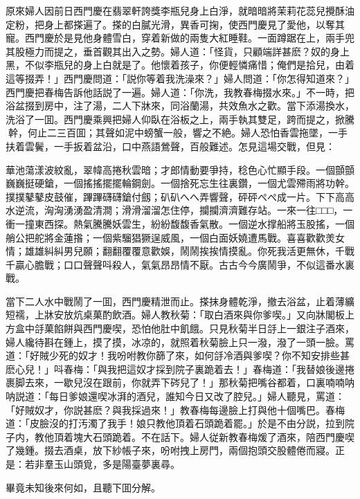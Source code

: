 原來婦人因前日西門慶在翡翠軒誇獎李瓶兒身上白淨，就暗暗將茉莉花蕊兒攪酥油定粉，把身上都搽遍了。搽的白膩光滑，異香可掬，使西門慶見了愛他，以奪其寵。西門慶於是見他身體雪白，穿着新做的兩隻大紅睡鞋。一面蹲踞在上，兩手兜其股極力而提之，垂首觀其出入之勢。婦人道：「怪貨，只顧端詳甚麽？奴的身上黑，不似李瓶兒的身上白就是了。他懷着孩子，你便輕憐痛惜；俺們是拾兒，由着這等掇弄！」西門慶問道：「説你等着我洗澡來？」婦人問道：「你怎得知道來？」西門慶把春梅告訴他話説了一遍。婦人道：「你洗，我教春梅掇水來。」不一時，把浴盆掇到房中，注了湯，二人下牀來，同浴蘭湯，共效魚水之歡。當下添湯換水，洗浴了一囬。西門慶乘興把婦人仰臥在浴板之上，兩手執其雙足，跨而提之，掀騰𢵞幹，何止二三百囬；其聲如泥中螃蟹一般，響之不絶。婦人恐怕香雲拖墜，一手扶着雲鬢，一手扳着盆沿，口中燕語鶯聲，百般難述。怎見這場交戰，但見：

\begin{myquote}
華池蕩漾波紋亂，翠幃高捲秋雲暗；才郎情動要爭持，稔色心忙顯手段。一個顫顫巍巍挺硬鎗，一個搖搖擺擺輪鋼劍。一個捨死忘生往裏鑽，一個尤雲殢雨將功幹。撲撲鼕鼕皮鼓催，蹕蹕礴礴鎗付劔；𥐙𥐙へへ弄響聲，砰砰ぺぺ成一片。下下高高水逆流，洶洶湧湧盈清澗；滑滑溜溜怎住停，攔攔濟濟難存站。一來一往□□□，一衝一撞東西探。熱氣騰騰妖雲生，紛紛馥馥香氣散。一個逆水撑船將玉股搖，一個艄公把舵將金蓮揝；一個紫騮猖獗逞威風，一個白面妖嬈遭馬戰。喜喜歡歡羙女情；雄雄糾糾男兒願；翻翻覆覆意歡娛，鬧鬧挨挨情摸亂。你死我活更無休，千戰千贏心膽戰；口口聲聲呌殺人，氣氣昂昂情不厭。古古今今廣鬧爭，不似這番水裏戰。
\end{myquote}

當下二人水中戰鬧了一囬，西門慶精泄而止。搽抹身體乾淨，撤去浴盆，止着薄纊短襦，上牀安放炕桌菓酌飲酒。婦人教秋菊：「取白酒來與你爹喫。」又向牀閣板上方盒中㧱菓餡餅與西門慶喫，恐怕他肚中飢餓。只見秋菊半日㧱上一銀注子酒來，婦人纔待斟在鍾上，摸了摸，冰凉的，就照着秋菊臉上只一潑，潑了一頭一臉。罵道：「好賊少死的奴才！我吩咐教你篩了來，如何㧱冷酒與爹喫？你不知安排些甚麽心兒！」呌春梅：「與我把這奴才採到院子裏跪着去！」春梅道：「我替娘後邊捲裹脚去來，一歇兒沒在跟前，你就弄下硶兒了！」那秋菊把嘴谷都着，口裏喃喃呐呐説道：「每日爹娘還喫冰湃的酒兒，誰知今日又改了腔兒。」婦人聽見，罵道：「好賊奴才，你説甚麽？與我採過來！」教春梅每邊臉上打與他十個嘴巴。春梅道：「皮臉沒的打汚濁了我手！娘只教他頂着石頭跪着罷。」於是不由分説，拉到院子内，教他頂着塊大石頭跪着。不在話下。婦人従新教春梅煖了酒來，陪西門慶喫了幾鍾。掇去酒桌，放下紗帳子來，吩咐拽上房門，兩個抱頭交股體倦而寢。正是：若非羣玉山頭覓，多是陽臺夢裏尋。

畢竟未知後來何如，且聽下囬分解。

